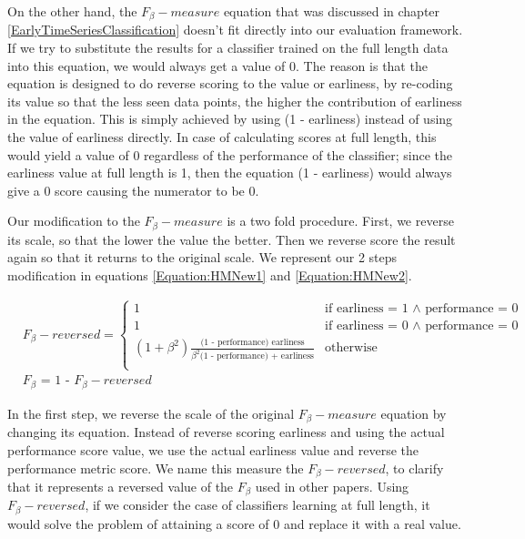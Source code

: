 On the other hand, the $F_{\beta}-measure$ equation that was discussed in chapter \ref{EarlyTimeSeriesClassification} doesn't fit directly into our evaluation framework.
If we try to substitute the results for a classifier trained on the full length data into this equation, we would always get a value of 0.
The reason is that the equation is designed to do reverse scoring to the value or earliness, by re-coding its value so that the less seen data points, the higher the contribution of earliness in the equation.
This is simply achieved by using (1 - earliness) instead of using the value of earliness directly.
In case of calculating scores at full length, this would yield a value of 0 regardless of the performance of the classifier;
since the earliness value at full length is 1, then the equation (1 - earliness) would always give a 0 score causing the numerator to be 0.

Our modification to the $F_{\beta}-measure$ is a two fold procedure.
First, we reverse its scale, so that the lower the value the better. Then we reverse score the result again so that it returns to the original scale.
We represent our 2 steps modification in equations \ref{Equation:HMNew1} and \ref{Equation:HMNew2}.

\begin{align}
    & F_{\beta}-reversed =
        \begin{cases}
          1 & \text{if earliness = 1 $\land$ performance = 0} \\
          1 & \text{if earliness = 0 $\land$ performance = 0} \\
          (1 + \beta^2)\frac{\text{(1 - performance) earliness}}{\beta^2 \text{(1 - performance) + earliness}} & \text{otherwise} \\
        \end{cases} \label{Equation:HMNew1} \\
    & F_{\beta} \text{ = 1 - } F_{\beta}-reversed \label{Equation:HMNew2}
\end{align}

In the first step, we reverse the scale of the original $F_{\beta}-measure$ equation by changing its equation.
Instead of reverse scoring earliness and using the actual performance score value, we use the actual earliness value and reverse the performance metric score.
We name this measure the $F_{\beta}-reversed$, to clarify that it represents a reversed value of the $F_{\beta}$ used in other papers.
Using $F_{\beta}-reversed$, if we consider the case of classifiers learning at full length, 
it would solve the problem of attaining a score of 0 and replace it with a real value.

